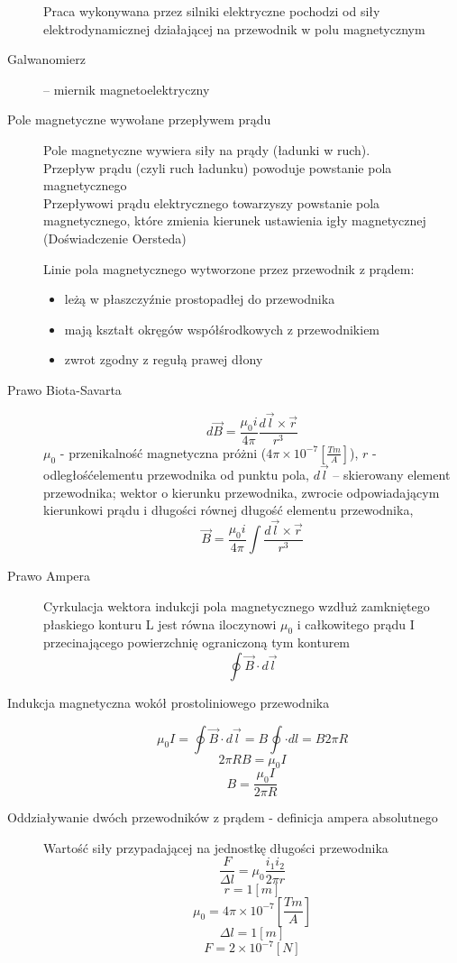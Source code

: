 \documentclass[a4paper,11pt]{article}
\begin{document}
\begin{description}
  Praca wykonywana przez silniki elektryczne pochodzi od siły elektrodynamicznej działającej na przewodnik w polu magnetycznym
\item[Galwanomierz] -- miernik magnetoelektryczny
\item[Pole magnetyczne wywołane przepływem prądu]

  Pole magnetyczne wywiera siły na prądy (ładunki w ruch).\\
  Przepływ prądu (czyli ruch ładunku) powoduje powstanie pola magnetycznego\\
  Przepływowi prądu elektrycznego towarzyszy powstanie pola magnetycznego, które zmienia kierunek ustawienia igły magnetycznej (Doświadczenie Oersteda)

  Linie pola magnetycznego wytworzone przez przewodnik z prądem:
  \begin{itemize}
  \item leżą w płaszczyźnie prostopadłej do przewodnika
  \item mają kształt okręgów współśrodkowych z przewodnikiem
  \item zwrot zgodny z regułą prawej dłony
  \end{itemize}
\item[Prawo Biota-Savarta]
  $$d\vec{B} = \frac{\mu_0i}{4\pi}\frac{d\vec{l}\times\vec{r}}{r^3}$$
  $\mu_0$ - przenikalność magnetyczna próżni ($4\pi\times 10^{-7} \left[\frac{Tm}{A}\right]$), $r$ - odległośćelementu przewodnika od punktu pola, $d \vec l$ – skierowany element przewodnika; wektor o kierunku przewodnika, zwrocie odpowiadającym kierunkowi prądu i długości równej długość elementu przewodnika,
  $$\vec{B} = \frac{\mu_0i}{4\pi}\int\frac{d\vec{l}\times\vec{r}}{r^3}$$
\item[Prawo Ampera]

  Cyrkulacja wektora indukcji pola magnetycznego wzdłuż zamkniętego płaskiego konturu L jest równa iloczynowi $\mu_0$ i całkowitego prądu I przecinającego powierzchnię ograniczoną tym konturem
  $$\oint\vec{B}\cdot d\vec{l}$$
\item[Indukcja magnetyczna wokół prostoliniowego przewodnika]
  $$\mu_0I=\oint\vec{B}\cdot d\vec{l}=B\oint\cdot dl=B2\pi R$$
  $$2\pi RB  =\mu_0I$$
  $$B=\frac{\mu_0I}{2\pi R}$$
\item[Oddziaływanie dwóch przewodników z prądem - definicja ampera absolutnego]

  Wartość siły przypadającej na jednostkę długości przewodnika
  $$\frac{F}{\Delta l}=\mu_0\frac{i_1i_2}{2\pi r}$$
  $$r= 1 [m]$$
  $$\mu_0 = 4\pi\times 10^{-7} \left[\frac{Tm}{A}\right]$$
  $$\Delta l = 1[m]$$
  $$F = 2 \times 10^{-7} [N] $$


\end{description}
\end{document}
